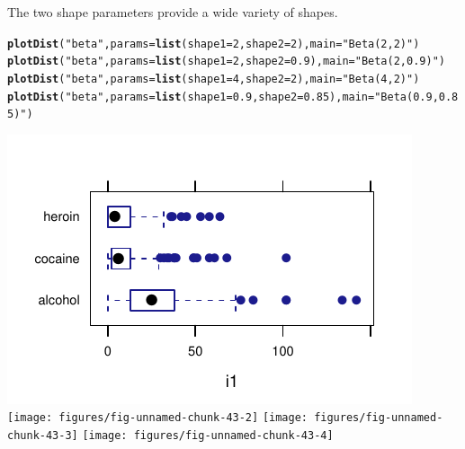 \documentclass[twoside]{book}\usepackage[]{graphicx}\usepackage[]{xcolor}
\makeatletter
\def\maxwidth{ %
  \ifdim\Gin@nat@width>\linewidth
    \linewidth
  \else
    \Gin@nat@width
  \fi
}
\newcommand{\hlnum}[1]{\textcolor[rgb]{0.686,0.059,0.569}{#1}}%
\newcommand{\hlstr}[1]{\textcolor[rgb]{0.192,0.494,0.8}{#1}}%
\newcommand{\hlstd}[1]{\textcolor[rgb]{0.345,0.345,0.345}{#1}}%
\newcommand{\hlkwc}[1]{\textcolor[rgb]{0.333,0.667,0.333}{#1}}%
\newcommand{\hlkwd}[1]{\textcolor[rgb]{0.737,0.353,0.396}{\textbf{#1}}}%
\newenvironment{kframe}{%
 \def\at@end@of@kframe{}%
 \ifinner\ifhmode%
  \def\at@end@of@kframe{\end{minipage}}%
  \begin{minipage}{\columnwidth}%
 \fi\fi%
 \def\FrameCommand##1{\hskip\@totalleftmargin \hskip-\fboxsep
 \colorbox{shadecolor}{##1}\hskip-\fboxsep
     \hskip-\linewidth \hskip-\@totalleftmargin \hskip\columnwidth}%
 \MakeFramed {\advance\hsize-\width
   \@totalleftmargin\z@ \linewidth\hsize
   \@setminipage}}%
 {\par\unskip\endMakeFramed%
 \at@end@of@kframe}
\newenvironment{knitrout}{}{} %
\makeatother
\begin{document}
The two shape parameters provide a wide variety of shapes.

\begin{knitrout}
\color{fgcolor}\begin{kframe}
\begin{alltt}
\hlkwd{plotDist}\hlstd{(}\hlstr{"beta"}\hlstd{,} \hlkwc{params} \hlstd{=} \hlkwd{list}\hlstd{(}\hlkwc{shape1} \hlstd{=} \hlnum{2}\hlstd{,} \hlkwc{shape2} \hlstd{=} \hlnum{2}\hlstd{),} \hlkwc{main} \hlstd{=} \hlstr{"Beta(2,2)"}\hlstd{)}
\hlkwd{plotDist}\hlstd{(}\hlstr{"beta"}\hlstd{,} \hlkwc{params} \hlstd{=} \hlkwd{list}\hlstd{(}\hlkwc{shape1} \hlstd{=} \hlnum{2}\hlstd{,} \hlkwc{shape2} \hlstd{=} \hlnum{0.9}\hlstd{),} \hlkwc{main} \hlstd{=} \hlstr{"Beta(2,0.9)"}\hlstd{)}
\hlkwd{plotDist}\hlstd{(}\hlstr{"beta"}\hlstd{,} \hlkwc{params} \hlstd{=} \hlkwd{list}\hlstd{(}\hlkwc{shape1} \hlstd{=} \hlnum{4}\hlstd{,} \hlkwc{shape2} \hlstd{=} \hlnum{2}\hlstd{),} \hlkwc{main} \hlstd{=} \hlstr{"Beta(4,2)"}\hlstd{)}
\hlkwd{plotDist}\hlstd{(}\hlstr{"beta"}\hlstd{,} \hlkwc{params} \hlstd{=} \hlkwd{list}\hlstd{(}\hlkwc{shape1} \hlstd{=} \hlnum{0.9}\hlstd{,} \hlkwc{shape2} \hlstd{=} \hlnum{0.85}\hlstd{),} \hlkwc{main} \hlstd{=} \hlstr{"Beta(0.9,0.85)"}\hlstd{)}
\end{alltt}
\end{kframe}

{\centering \includegraphics[width=\maxwidth]{figures/fig-unnamed-chunk-43-1} 
\texttt{[image: figures/fig-unnamed-chunk-43-2]} 
\texttt{[image: figures/fig-unnamed-chunk-43-3]} 
\texttt{[image: figures/fig-unnamed-chunk-43-4]} 

}



\end{knitrout}
\end{document}
